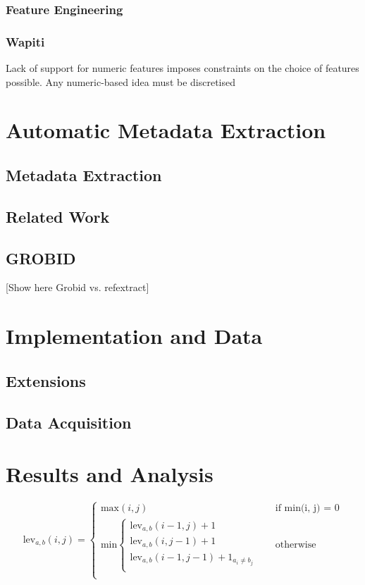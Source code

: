 \documentclass[10pt, oneside]{scrartcl}   	%
\begin{document}
\subsubsection{Feature Engineering}
\subsubsection{Wapiti}
Lack of support for numeric features imposes constraints on the choice of features possible. Any numeric-based idea must be discretised
\section{Automatic Metadata Extraction}
\subsection{Metadata Extraction}
\subsection{Related Work}
\subsection{GROBID}
[Show here Grobid vs. refextract]
\section{Implementation and Data}
\subsection{Extensions}
\subsection{Data Acquisition}
\section{Results and Analysis}
\[
  \text{lev}_{a, b}(i, j) = 
  \begin{cases} 
  	\text{max}(i, j) &\quad\text{if min(i, j) = 0} \\
	\text{min}
		\begin{cases}
			\text{lev}_{a, b}(i - 1, j) + 1 \\
			\text{lev}_{a, b}(i, j - 1) + 1 \\
			\text{lev}_{a, b}(i - 1, j - 1) + 1_{a_i \neq b_j} \\
		\end{cases} &\quad\text{otherwise} \\
  \end{cases}
\]
\end{document}
